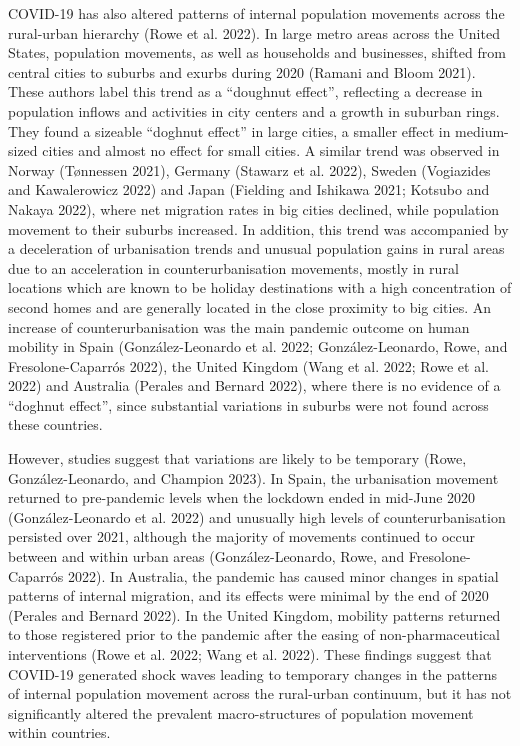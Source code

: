 \documentclass[11pt,letterpaper]{article}
\begin{document}
COVID-19 has also altered patterns of internal population movements
across the rural-urban hierarchy (Rowe et al. 2022). In large metro
areas across the United States, population movements, as well as
households and businesses, shifted from central cities to suburbs and
exurbs during 2020 (Ramani and Bloom 2021). These authors label this
trend as a ``doughnut effect'', reflecting a decrease in population
inflows and activities in city centers and a growth in suburban rings.
They found a sizeable ``doghnut effect'' in large cities, a smaller
effect in medium-sized cities and almost no effect for small cities. A
similar trend was observed in Norway (Tønnessen 2021), Germany (Stawarz
et al. 2022), Sweden (Vogiazides and Kawalerowicz 2022) and Japan
(Fielding and Ishikawa 2021; Kotsubo and Nakaya 2022), where net
migration rates in big cities declined, while population movement to
their suburbs increased. In addition, this trend was accompanied by a
deceleration of urbanisation trends and unusual population gains in
rural areas due to an acceleration in counterurbanisation movements,
mostly in rural locations which are known to be holiday destinations
with a high concentration of second homes and are generally located in
the close proximity to big cities. An increase of counterurbanisation
was the main pandemic outcome on human mobility in Spain
(González-Leonardo et al. 2022; González-Leonardo, Rowe, and
Fresolone-Caparrós 2022), the United Kingdom (Wang et al. 2022; Rowe et
al. 2022) and Australia (Perales and Bernard 2022), where there is no
evidence of a ``doghnut effect'', since substantial variations in
suburbs were not found across these countries.

However, studies suggest that variations are likely to be temporary
(Rowe, González-Leonardo, and Champion 2023). In Spain, the urbanisation
movement returned to pre-pandemic levels when the lockdown ended in
mid-June 2020 (González-Leonardo et al. 2022) and unusually high levels
of counterurbanisation persisted over 2021, although the majority of
movements continued to occur between and within urban areas
(González-Leonardo, Rowe, and Fresolone-Caparrós 2022). In Australia,
the pandemic has caused minor changes in spatial patterns of internal
migration, and its effects were minimal by the end of 2020 (Perales and
Bernard 2022). In the United Kingdom, mobility patterns returned to
those registered prior to the pandemic after the easing of
non-pharmaceutical interventions (Rowe et al. 2022; Wang et al. 2022).
These findings suggest that COVID-19 generated shock waves leading to
temporary changes in the patterns of internal population movement across
the rural-urban continuum, but it has not significantly altered the
prevalent macro-structures of population movement within countries.
\end{document}

